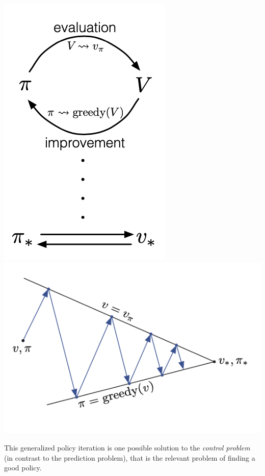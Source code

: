 \begin{center}
\begin{minipage}{\linewidth}
\includegraphics[scale=0.75]{graphics/generalized_policy_iteration.png}
\includegraphics[scale=1]{graphics/generalized_policy_iteration_2.png}
\end{minipage}
\end{center}

This generalized policy iteration is one possible solution to the \emph{control problem} (in contrast to the prediction problem), that is the relevant problem of finding a good policy. \\

